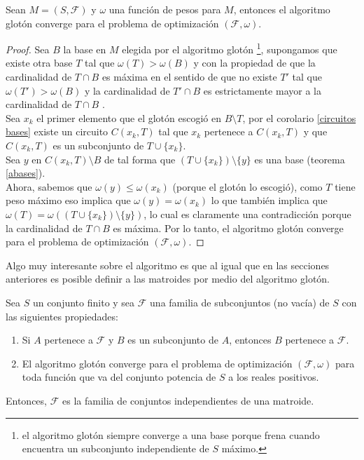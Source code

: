 \begin{teo}
Sean $M=(S,\mathcal{F})$ y $\omega$ una función de pesos para $M$, entonces el algoritmo glotón converge para el problema de optimización $(\mathcal{F}, \omega)$. 
\end{teo}
\begin{proof}
Sea $B$ la base en $M$ elegida por el algoritmo glotón \footnote{el algoritmo glotón siempre converge a una base porque frena cuando encuentra un subconjunto independiente de $S$ máximo.}, supongamos que existe otra base $T$ tal que $\omega(T)> \omega(B)$ y con la propiedad de que la cardinalidad de $T\cap B$ es máxima en el sentido de que no existe $T'$ tal que $\omega(T')> \omega(B)$ y la cardinalidad de $T'\cap B$ es estrictamente mayor a la cardinalidad de $T\cap B$ . \\
Sea $x_k$ el primer elemento que el glotón escogió en $B \setminus T$, por el corolario \ref{circuitos bases} existe un circuito $C(x_k,T)$ tal que $x_k$ pertenece a $C(x_k,T)$ y que $C(x_k,T)$ es un subconjunto de $T \cup \{x_k\}$. \\
Sea $y$ en $C(x_k,T) \setminus B$ de tal forma que $(T \cup \{x_k\}) \setminus \{y\}$ es una base (teorema \ref{abases}). \\ 
Ahora, sabemos que $\omega(y)\leq \omega(x_k)$ (porque el glotón lo escogió), como $T$ tiene peso máximo eso implica que $\omega(y)=\omega(x_k)$ lo que también implica que $\omega(T)=\omega((T \cup \{x_k\}) \setminus \{y\})$, lo cual es claramente una contradicción porque la cardinalidad de $T\cap B$ es máxima. Por lo tanto, el algoritmo glotón converge para el problema de optimización $(\mathcal{F}, \omega)$.
\end{proof}

Algo muy interesante sobre el algoritmo es que al igual que en las secciones anteriores es posible definir a las matroides por medio del algoritmo glotón. 

\begin{teo} \label{axiomas gloton}
Sea $S$ un conjunto finito y sea $\mathcal{F}$ una familia de subconjuntos (no vacía) de $S$ con las siguientes propiedades:
\begin{enumerate}
\item Si $A$ pertenece a $\mathcal{F}$ y $B$ es un subconjunto de $A$, entonces $B$ pertenece a $\mathcal{F}$.
\item El algoritmo glotón converge para el problema de optimización $(\mathcal{F},\omega)$ para toda función que va del conjunto potencia de $S$ a los reales positivos.
\end{enumerate}
Entonces, $\mathcal{F}$ es la familia de conjuntos independientes de una matroide. 
\end{teo}

